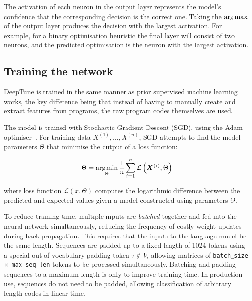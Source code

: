 The activation of each neuron in the output layer represents the model's confidence that the corresponding decision is the correct one. Taking the $\operatorname*{arg\,max}$ of the output layer produces the decision with the largest activation. For example, for a binary optimisation heuristic the final layer will consist of two neurons, and the predicted optimisation is the neuron with the largest activation.


\subsection{Training the network}

DeepTune is trained in the same manner as prior supervised machine learning works, the key difference being that instead of having to manually create and extract features from programs, the raw program codes themselves are used.

The model is trained with Stochastic Gradient Descent (SGD), using the Adam optimiser~\cite{Kingma2015}. For training data $X^{(1)}, \ldots, X^{(n)}$, SGD attempts to find the model parameters $\Theta$ that minimise the output of a loss function:

\begin{equation}
\Theta = \operatorname*{arg\,min}_{\Theta} \frac{1}{n} \sum_{i=1}^{n} \mathcal{L} \left( \bm{X}^{(i)}, \Theta \right)
\end{equation}

where loss function $\mathcal{L} \left(x, \Theta \right)$ computes the logarithmic difference between the predicted and expected values given a model constructed using parameters $\Theta$.

To reduce training time, multiple inputs are \emph{batched} together and fed into the neural network simultaneously, reducing the frequency of costly weight updates during back-propagation. This requires that the inputs to the language model be the same length. Sequences are padded up to a fixed length of 1024 tokens using a special out-of-vocabulary padding token $\tau \not\in V$, allowing matrices of \texttt{batch\_size} $\times$ \texttt{max\_seq\_len} tokens to be processed simultaneously. Batching and padding sequences to a maximum length is only to improve training time. In production use, sequences do not need to be padded, allowing classification of arbitrary length codes in linear time.
